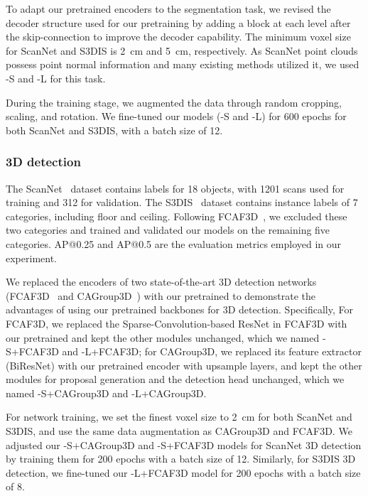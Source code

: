 \documentclass[10pt,twocolumn,letterpaper]{article}
\begin{document}
To adapt our pretrained encoders to the segmentation task, we revised the decoder structure used for our pretraining by adding a {\SST} block at each level after the skip-connection to improve the decoder capability. The minimum voxel size for ScanNet and S3DIS is \SI{2}{cm} and \SI{5}{cm}, respectively. As ScanNet point clouds possess point normal information and many existing methods utilized it, we used \SST-S and \SST-L for this task.

 During the training stage, we augmented the data through random cropping, scaling, and rotation. We fine-tuned our models (\SST-S and \SST-L) for 600 epochs for both ScanNet and S3DIS, with a batch size of 12.

\subsubsection{3D detection}

The ScanNet~\cite{dai2017scannet} dataset contains labels for 18 objects, with 1201 scans used for training and 312 for validation. The S3DIS~\cite{S3DIS} dataset contains instance labels of 7 categories, including floor and ceiling. Following FCAF3D~\cite{rukhovich2021fcaf3d}, we excluded these two categories and trained and validated our models on the remaining five categories. AP@0.25 and AP@0.5 are the evaluation metrics employed in our experiment.

We replaced the encoders of two state-of-the-art 3D detection networks (FCAF3D~\cite{rukhovich2021fcaf3d} and CAGroup3D~\cite{wang2022cagroupd}) with our pretrained {\SST} to demonstrate the advantages of using our pretrained backbones for 3D detection. Specifically, For FCAF3D, we replaced the Sparse-Convolution-based ResNet in FCAF3D with our pretrained {\SST} and kept the other modules unchanged, which we named {\SST}-S+FCAF3D and {\SST}-L+FCAF3D; for CAGroup3D, we replaced its feature extractor (BiResNet) with our pretrained encoder with upsample layers, and kept the other modules for proposal generation and the detection head unchanged, which we named {\SST}-S+CAGroup3D and {\SST}-L+CAGroup3D.

For network training, we set the finest voxel size to \SI{2}{cm} for both ScanNet and S3DIS, and use the same data augmentation as CAGroup3D and FCAF3D. We adjusted our \SST-S+CAGroup3D and \SST-S+FCAF3D models for ScanNet 3D detection by training them for 200 epochs with a batch size of 12. Similarly, for S3DIS 3D detection, we fine-tuned our \SST-L+FCAF3D model for 200 epochs with a batch size of 8.
\end{document}
